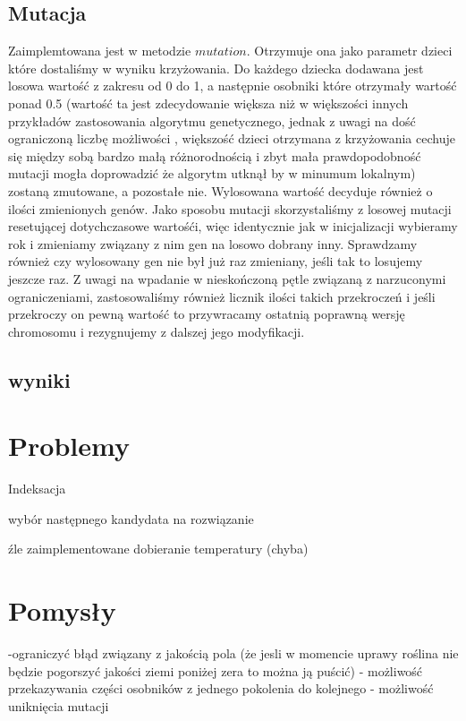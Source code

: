 \documentclass{article}
\begin{document}
\subsection{Mutacja}
Zaimplemtowana jest w metodzie $mutation$. Otrzymuje ona jako parametr dzieci  które dostaliśmy w wyniku krzyżowania. Do każdego dziecka dodawana jest losowa wartość z zakresu od 0 do 1, a następnie osobniki które otrzymały wartość ponad 0.5 (wartość ta jest zdecydowanie większa niż w większości innych przykładów zastosowania algorytmu genetycznego, jednak z uwagi na dość ograniczoną liczbę możliwości , większość dzieci otrzymana z krzyżowania cechuje się między sobą bardzo małą różnorodnością i zbyt mała prawdopodobność mutacji mogła doprowadzić że algorytm utknął by w minumum lokalnym)  zostaną zmutowane, a pozostałe nie. Wylosowana wartość decyduje również o ilości zmienionych genów. Jako sposobu mutacji skorzystaliśmy z losowej mutacji resetującej dotychczasowe wartośći, więc identycznie jak w inicjalizacji wybieramy rok i zmieniamy związany z nim gen na losowo dobrany inny. Sprawdzamy również czy wylosowany gen nie był już raz zmieniany, jeśli tak to losujemy jeszcze raz. Z uwagi na wpadanie w nieskończoną pętle związaną z narzuconymi ograniczeniami, zastosowaliśmy również licznik ilości takich przekroczeń i jeśli przekroczy on pewną wartość to przywracamy ostatnią poprawną wersję chromosomu i rezygnujemy z dalszej jego modyfikacji.
\subsection{wyniki}


\section{Problemy}
Indeksacja

wybór następnego kandydata na rozwiązanie

źle zaimplementowane dobieranie temperatury (chyba)
\section{Pomysły}
-ograniczyć błąd związany z jakością pola (że jesli w momencie uprawy roślina nie będzie pogorszyć jakości ziemi poniżej zera to można ją puścić)
- możliwość przekazywania części osobników z jednego pokolenia do kolejnego
- możliwość uniknięcia mutacji
\end{document}
